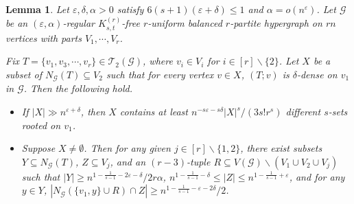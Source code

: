 \documentclass[11pt]{article}
\newtheorem{lem}[dfn]{Lemma}
\begin{document}
\begin{lem}\label{lem: reduce to bipartite}
Let $\varepsilon, \delta, \alpha>0$ satisfy $6(s+1)(\varepsilon + \delta)\le 1$ and $\alpha=o\left(n^{\varepsilon}\right)$.
Let $\mathcal G$ be an $(\varepsilon,\alpha)$-regular $K_{s,t}^{(r)}$-free $r$-uniform balanced $r$-partite hypergraph on $rn$ vertices with parts $V_1,\cdots, V_r$.

Fix $T=\{v_1,v_3,\cdots, v_r\}\in \mathcal T_2(\mathcal G)$, where $v_i\in V_i$ for $i\in [r]\backslash \{2\}$.
Let $X$ be a subset of $N_{\mathcal G}(T)\subseteq V_2$ such that for every vertex $v\in X$, $(T;v)$ is $\delta $-dense on $v_1$ in $\mathcal G$.
Then the following hold.
\begin{itemize}
\item[(1).] If $|X|\gg n^{\varepsilon+\delta}$, then $X$ contains at least $n^{-s\varepsilon-s\delta }|X|^s/(3s!r^s)$ different $s$-sets rooted on $v_{1}$.
\item[(2).] Suppose $X\neq \emptyset$. Then for any given $j\in [r]\backslash \{1,2\}$,
there exist subsets $Y\subseteq N_{\mathcal G}(T)$, $Z\subseteq V_j$, and an $(r-3)$-tuple $R\subseteq V(\mathcal G)\backslash (V_1\cup V_2\cup V_j)$ such that $|Y|\ge n^{1-\frac{1}{s-1}- 2 \varepsilon -\delta}/2r\alpha$, $n^{1-\frac{1}{s-1}-\delta} \le |Z| \le n^{1-\frac{1}{s-1} +\varepsilon}$, and for any $y \in Y$, $|N_{\mathcal G}(\{v_1, y\}\cup R)\cap Z|\ge n^{1-\frac{1}{s-1} - \varepsilon-2\delta}/2$.
\end{itemize}
\end{lem}
\end{document}
